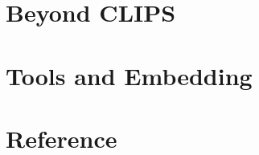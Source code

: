 \documentclass[11pt,letterpaper,openany]{book}
\begin{document}
\part{Beyond CLIPS}







\part{Tools and Embedding}



\appendix
\part{Reference}



\end{document}
